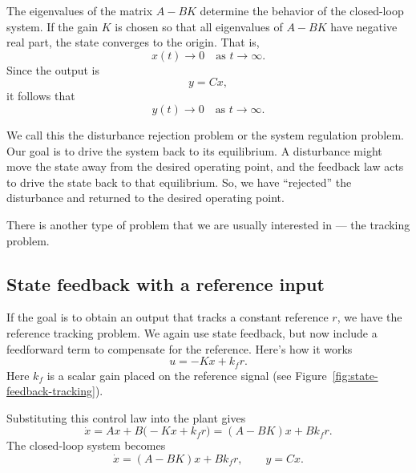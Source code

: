 \documentclass{ee122_notes}
\begin{document}
The eigenvalues of the matrix \(A-BK\) determine the behavior of the closed-loop system. If the gain \(K\) is chosen so that all eigenvalues of \(A-BK\) have negative real part, the state converges to the origin. That is,
\[
x(t)\to 0
\quad \text{as } t\to\infty.
\]
Since the output is
\[
y = Cx,
\]
it follows that
\[
y(t) \to 0
\quad \text{as } t\to\infty.
\]

We call this the disturbance rejection problem or the system regulation problem. Our goal is to drive the system back to its equilibrium. A disturbance might move the state away from the desired operating point, and the feedback law acts to drive the state back to that equilibrium. So, we have ``rejected'' the disturbance and returned to the desired operating point.

There is another type of problem that we are usually interested in --- the tracking problem. 

\subsection{State feedback with a reference input}

If the goal is to obtain an output that tracks a constant reference \(r\), we have the reference tracking problem. We again use state feedback, but now include a feedforward term to compensate for the reference. Here's how it works 
\[
u =-Kx +k_f r.
\]
Here \(k_f\) is a scalar gain placed on the reference signal (see Figure~\ref{fig:state-feedback-tracking}).

Substituting this control law into the plant gives
\[
\dot x =Ax +B\bigl(-Kx +k_f r\bigr)
=
(A-BK)x+Bk_f r.
\]
The closed-loop system becomes
\[
\dot x=(A-BK)x+Bk_f r,
\qquad
y = Cx.
\]
\end{document}
